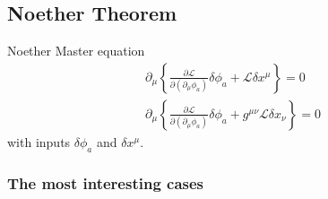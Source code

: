 \documentclass[10pt,a4paper]{report}
\theoremstyle{definition}
\begin{document}
\subsection{Noether Theorem}
Noether Master equation
\begin{align}
\partial_\mu\left\{\frac{\partial\mathcal{L}}{\partial(\partial_\mu\phi_a)}\delta\phi_a+\mathcal{L}\delta x^\mu\right\}=0\\
\partial_\mu\left\{\frac{\partial\mathcal{L}}{\partial(\partial_\mu\phi_a)}\delta\phi_a+g^{\mu\nu}\mathcal{L}\delta x_\nu\right\}=0
\end{align}
with inputs $\delta\phi_a$ and $\delta x^\mu$. 

\subsubsection{The most interesting cases}
\end{document}
